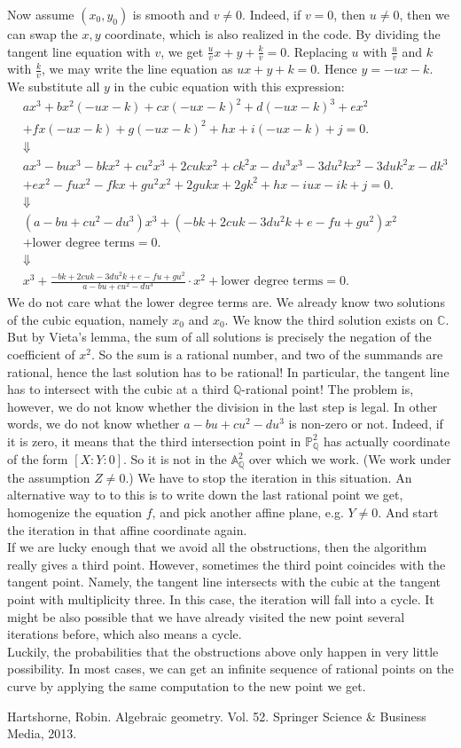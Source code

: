 \documentclass[a4paper,oneside,11pt]{article}
\newcommand{\bA}{\mathbb{A}}
\newcommand{\bC}{\mathbb{C}}
\newcommand{\bP}{\mathbb{P}}
\newcommand{\bQ}{\mathbb{Q}}
\theoremstyle{definition}
\begin{document}
Now assume $(x_0,y_0)$ is smooth and $v\neq 0$. Indeed, if $v=0$, then $u\neq0$, then we can swap the $x,y$ coordinate, which is also realized in the code. By dividing the tangent line equation with $v$, we get $\frac{u}{v}x+y+\frac{k}{v}=0$. Replacing $u$ with $\frac{u}{v}$ and $k$ with $\frac{k}{v}$, we may write the line equation as $ux+y+k=0$. Hence $y=-ux-k$. We substitute all $y$ in the cubic equation with this expression:
\begin{align*}
	&ax^3+bx^2(-ux-k)+cx(-ux-k)^2+d(-ux-k)^3+ex^2\\&+fx(-ux-k)+g(-ux-k)^2+hx+i(-ux-k)+j=0. \\ &\Downarrow\\
	&ax^3-bux^3-bkx^2+cu^2x^3+2cukx^2+ck^2x-du^3x^3-3du^2kx^2-3duk^2x-dk^3\\&+ex^2-fux^2-fkx+gu^2x^2+2gukx+2gk^2+hx-iux-ik+j=0.\\ &\Downarrow\\
	&(a-bu+cu^2-du^3)x^3+(-bk+2cuk-3du^2k+e-fu+gu^2)x^2\\&+ \text{lower degree terms}=0.\\ &\Downarrow\\
	&x^3+\frac{-bk+2cuk-3du^2k+e-fu+gu^2}{a-bu+cu^2-du^3}\cdot x^2+ \text{lower degree terms}=0.
\end{align*}
We do not care what the lower degree terms are. We already know two solutions of the cubic equation, namely $x_0$ and $x_0$. We know the third solution exists on $\bC$. But by Vieta's lemma, the sum of all solutions is precisely the negation of the coefficient of $x^2$. So the sum is a rational number, and two of the summands are rational, hence the last solution has to be rational! In particular, the tangent line has to intersect with the cubic at a third $\bQ$-rational point!
The problem is, however, we do not know whether the division in the last step is legal. In other words, we do not know whether $a-bu+cu^2-du^3$ is non-zero or not. Indeed, if it is zero, it means that the third intersection point in $\bP^2_\bQ$ has actually coordinate of the form $[X:Y:0]$. So it is not in the $\bA^2_\bQ$ over which we work. (We work under the assumption $Z\neq 0$.) We have to stop the iteration in this situation. An alternative way to to this is to write down the last rational point we get, homogenize the equation $f$, and pick another affine plane, e.g. $Y\neq 0$. And start the iteration in that affine coordinate again.\\
If we are lucky enough that we avoid all the obstructions, then the algorithm really gives a third point. However, sometimes the third point coincides with the tangent point. Namely, the tangent line intersects with the cubic at the tangent point with multiplicity three. In this case, the iteration will fall into a cycle. It might be also possible that we have already visited the new point several iterations before, which also means a cycle.\\
Luckily, the probabilities that the obstructions above only happen in very little possibility. In most cases, we can get an infinite sequence of rational points on the curve by applying the same computation to the new point we get.

\begin{thebibliography}{99}
	 Hartshorne, Robin. Algebraic geometry. Vol. 52. Springer Science \& Business Media, 2013.
\end{thebibliography}
\end{document}
